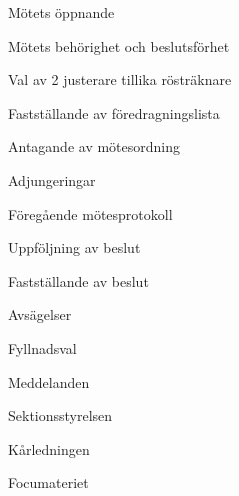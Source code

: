 \documentclass[prelim]{sektionsmote}
\begin{document}
\maketitle

\begin{ootd}

\item{Mötets öppnande}

\item{Mötets behörighet och beslutsförhet}

\item{Val av 2 justerare tillika rösträknare}

\item{Fastställande av föredragningslista}

\item{Antagande av mötesordning}

\item{Adjungeringar}

\item{Föregående mötesprotokoll}

\item{Uppföljning av beslut}

\item{Fastställande av beslut}
\begin{ootd}
    \item Avsägelser
    \item Fyllnadsval
\end{ootd}

\item{Meddelanden}
\begin{ootd}
    \item Sektionsstyrelsen
    \item Kårledningen
    \item Focumateriet
\end{ootd}


\end{ootd}
\end{document}
